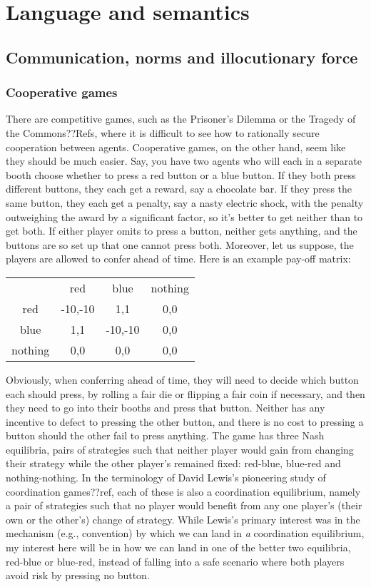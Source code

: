 \def\mychapter{VII}

\chapter{Language and semantics}\label{ch:semantics}
\section{Communication, norms and illocutionary force}
\subsection{Cooperative games}
There are competitive games, such as the Prisoner's Dilemma or the Tragedy of the Commons??Refs, where it is difficult 
to see how to rationally secure cooperation between agents. Cooperative games, on the other hand, seem like
they should be much easier. Say, you have
two agents who will each in a separate booth choose whether to press a red button or a blue button. If they both
press different buttons, they each get a reward, say a chocolate bar. If they press the same button, they 
each get a penalty, say a nasty electric shock, with the penalty outweighing the award by a significant factor, so it's better 
to get neither than to get both. If either player omits to press a button, neither gets anything, and the buttons are so 
set up that one cannot press both. Moreover, let us suppose, the players are allowed to confer ahead of time. Here is an
example pay-off matrix:

\begin{center}
\begin{tabular}{ | c | c | c | c | }
\hline
    & red & blue & nothing \\
red & -10,-10 & 1,1  & 0,0 \\
blue & 1,1 & -10,-10 & 0,0 \\
nothing & 0,0 & 0,0 & 0,0 \\
\hline
\end{tabular}
\end{center}

Obviously, when conferring ahead of time, they will need to decide which button each should press, by rolling a fair die or
flipping a fair coin if
necessary, and then they need to go into their booths and press that button. Neither has any incentive to defect
to pressing the other button, and there is no cost to pressing a button should the other fail to press
anything. The game has three Nash equilibria, pairs of strategies such that neither player would gain from
changing their strategy while the other player's remained fixed: red-blue, blue-red and nothing-nothing. In 
the terminology of David Lewis's pioneering study of coordination games??ref, each of these is also a coordination 
equilibrium, namely a pair of strategies such that no player would benefit from any one player's (their own or the other's) change of strategy. While Lewis's primary interest was in the mechanism (e.g., convention) by which we can land
in \textit{a} coordination equilibrium, my interest here will be in how we can land in one of the better two equilibria,
red-blue or blue-red, instead of falling into a safe scenario where both players avoid risk by pressing no button. 

